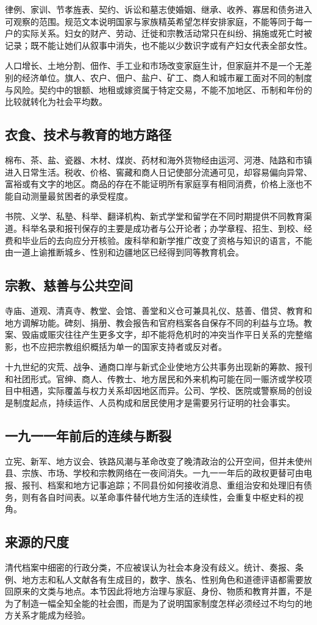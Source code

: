 律例、家训、节孝旌表、契约、诉讼和墓志使婚姻、继承、收养、寡居和债务进入可观察的范围。规范文本说明国家与家族精英希望怎样安排家庭，不能等同于每一户的实际关系。妇女的财产、劳动、迁徙和宗教活动常只在纠纷、捐施或死亡时被记录；既不能让她们从叙事中消失，也不能以少数识字或有产妇女代表全部女性。

人口增长、土地分割、佃作、手工业和市场改变家庭生计，但家庭并不是一个无差别的经济单位。旗人、农户、佃户、盐户、矿工、商人和城市雇工面对不同的制度与风险。契约中的银额、地租或嫁资属于特定交易，不能不加地区、币制和年份的比较就转化为社会平均数。

\subsection{衣食、技术与教育的地方路径}

棉布、茶、盐、瓷器、木材、煤炭、药材和海外货物经由运河、河港、陆路和市镇进入日常生活。税收、价格、窖藏和商人日记使部分流通可见，却容易偏向异常、富裕或有文字的地区。商品的存在不能证明所有家庭享有相同消费，价格上涨也不能自动测量最贫困者的承受程度。

书院、义学、私塾、科举、翻译机构、新式学堂和留学在不同时期提供不同教育渠道。科举名录和报刊保存的主要是成功者与公开论者；办学章程、招生、到校、经费和毕业后的去向应分开核验。废科举和新学推广改变了资格与知识的语言，不能由一道上谕推断城乡、性别和边疆地区已经得到同等教育机会。

\subsection{宗教、慈善与公共空间}

寺庙、道观、清真寺、教堂、会馆、善堂和义仓可兼具礼仪、慈善、借贷、教育和地方调解功能。碑刻、捐册、教会报告和官府档案各自保存不同的利益与立场。教案、毁庙或赈灾往往产生更多文字，却不能将危机时的冲突当作平日关系的完整缩影，也不应把宗教组织概括为单一的国家支持者或反对者。

十九世纪的灾荒、战争、通商口岸与新式企业使地方公共事务出现新的筹款、报刊和社团形式。官绅、商人、传教士、地方居民和外来机构可能在同一赈济或学校项目中相遇，实际覆盖与权力关系却因地区而异。公司、学校、医院或警察局的创设是制度起点，持续运作、人员构成和居民使用才是需要另行证明的社会事实。

\subsection{一九一一年前后的连续与断裂}

立宪、新军、地方议会、铁路风潮与革命改变了晚清政治的公开空间，但并未使州县、宗族、市场、学校和宗教网络在一夜间消失。一九一一年后的政权更替可由电报、报刊、档案和地方记事追踪；不同县份如何接收消息、重组治安和处理旧有债务，则有各自时间表。以革命事件替代地方生活的连续性，会重复中枢史料的视角。

\subsection{来源的尺度}

清代档案中细密的行政分类，不应被误认为社会本身没有歧义。统计、奏报、条例、地方志和私人文献各有生成目的，数字、族名、性别角色和道德评语都需要放回原来的文类与地点。本节因此将地方治理与家庭、身份、物质和教育并置，不是为了制造一幅全知全能的社会图，而是为了说明国家制度怎样必须经过不均匀的地方关系才能成为经验。
